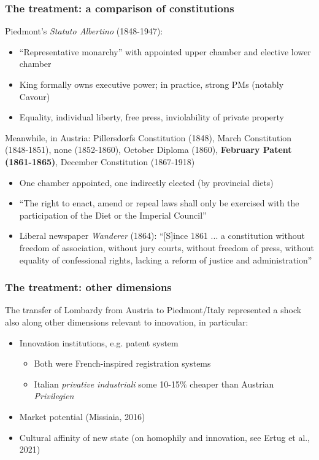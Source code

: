\documentclass[10pt]{beamer}
\begin{document}
\begin{frame}
    \frametitle{The treatment: a comparison of constitutions}
    
    Piedmont's \textit{Statuto Albertino} (1848-1947):
    \begin{itemize}
        \item ``Representative monarchy'' with appointed upper chamber and elective lower chamber 
        \item King formally owns executive power; in practice, strong PMs (notably Cavour)
        \item Equality, individual liberty, free press, inviolability of private property
    \end{itemize}

    \pause
    \bigskip
    
    Meanwhile, in Austria: Pillersdorfs Constitution (1848), March Constitution (1848-1851), none (1852-1860), October Diploma (1860), \textbf{February Patent (1861-1865)}, December Constitution (1867-1918)

    \begin{itemize}
        \item One chamber appointed, one indirectly elected (by provincial diets) 
        \item ``The right to enact, amend or repeal laws shall only be exercised with the participation of the Diet or the Imperial Council''
        \item Liberal newspaper \textit{Wanderer} (1864): ``[S]ince 1861 ... a constitution without freedom of association, without jury courts, without freedom of press, without equality of confessional rights, lacking a reform of justice and administration''
    \end{itemize}

\end{frame}

\begin{frame}
    \frametitle{The treatment: other dimensions}
    
    The transfer of Lombardy from Austria to Piedmont/Italy represented a shock also along other dimensions relevant to innovation, in particular:

    \begin{itemize}
        \item Innovation institutions, e.g. patent system

        \begin{itemize}
            \item Both were French-inspired registration systems
            \item Italian \textit{privative industriali} some 10-15\% cheaper than Austrian \textit{Privilegien}  
        \end{itemize}

        \item Market potential (Missiaia, 2016)
        \item Cultural affinity of new state (on homophily and innovation, see Ertug et al., 2021)
    \end{itemize}
    
\end{frame}
\end{document}
